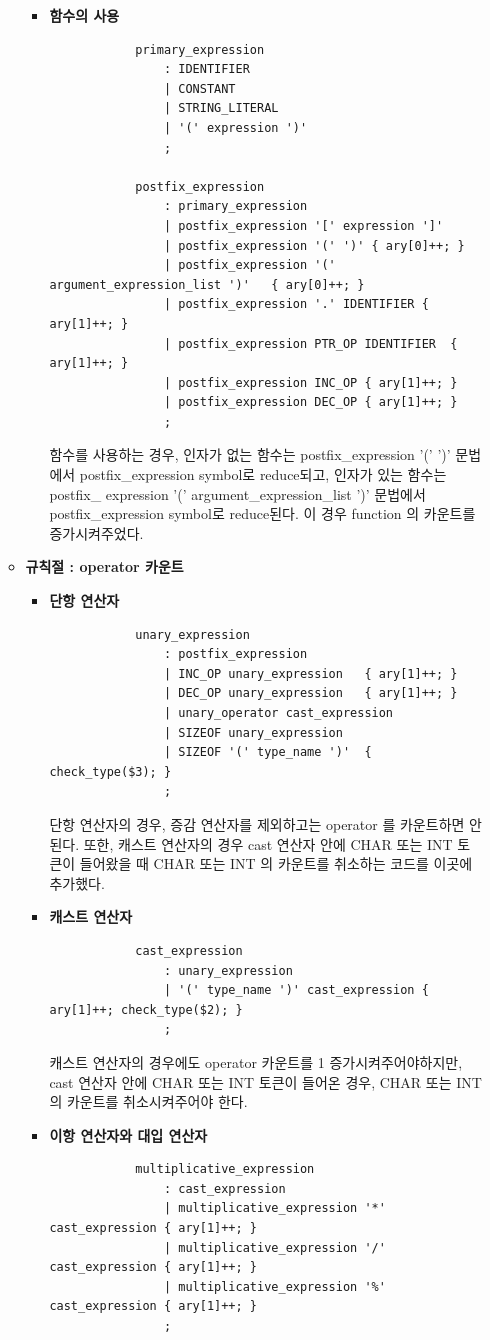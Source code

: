 \documentclass{article}
\begin{document}
\begin{itemize}
\begin{itemize}
\begin{itemize}
			\item {\bf 함수의 사용}
			\begin{lstlisting}
			primary_expression
				: IDENTIFIER
				| CONSTANT
				| STRING_LITERAL
				| '(' expression ')'
				;

			postfix_expression
				: primary_expression
				| postfix_expression '[' expression ']'
				| postfix_expression '(' ')' { ary[0]++; }
				| postfix_expression '(' argument_expression_list ')'	{ ary[0]++; }
				| postfix_expression '.' IDENTIFIER	{ ary[1]++; }
				| postfix_expression PTR_OP IDENTIFIER	{ ary[1]++; }
				| postfix_expression INC_OP	{ ary[1]++; }
				| postfix_expression DEC_OP	{ ary[1]++; }
				;
			\end{lstlisting}
			함수를 사용하는 경우, 인자가 없는 함수는 postfix\_expression '(' ')' 문법에서 postfix\_expression
			symbol로 reduce되고, 인자가 있는 함수는 postfix\_ expression '(' argument\_expression\_list ')'
			문법에서 postfix\_expression symbol로 reduce된다. 이 경우 function 의 카운트를 증가시켜주었다.
		\end{itemize}

		\item {\bf 규칙절 : operator 카운트}
		\begin{itemize}
			\item {\bf 단항 연산자}
			\begin{lstlisting}
			unary_expression
				: postfix_expression
				| INC_OP unary_expression	{ ary[1]++; }
				| DEC_OP unary_expression	{ ary[1]++; }
				| unary_operator cast_expression
				| SIZEOF unary_expression
				| SIZEOF '(' type_name ')'	{ check_type($3); }
				;
			\end{lstlisting} 
			단항 연산자의 경우, 증감 연산자를 제외하고는 operator 를 카운트하면 안된다.
			또한, 캐스트 연산자의 경우 cast 연산자 안에 CHAR 또는 INT 토큰이 들어왔을 때
			CHAR 또는 INT 의 카운트를 취소하는 코드를 이곳에 추가했다.

			\item {\bf 캐스트 연산자}
			\begin{lstlisting}
			cast_expression
				: unary_expression
				| '(' type_name ')' cast_expression	{ ary[1]++; check_type($2); }
				;
			\end{lstlisting}
			캐스트 연산자의 경우에도 operator 카운트를 1 증가시켜주어야하지만, cast 연산자 안에
			CHAR 또는 INT 토큰이 들어온 경우, CHAR 또는 INT 의 카운트를 취소시켜주어야 한다.
			
			\item {\bf 이항 연산자와 대입 연산자}
			\begin{lstlisting}
			multiplicative_expression
				: cast_expression
				| multiplicative_expression '*' cast_expression	{ ary[1]++; }
				| multiplicative_expression '/' cast_expression	{ ary[1]++; }
				| multiplicative_expression '%' cast_expression	{ ary[1]++; }
				;


\end{lstlisting}
\end{itemize}
\end{itemize}
\end{itemize}
\end{document}
